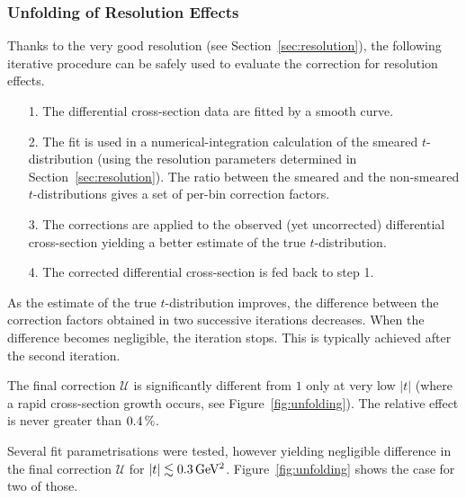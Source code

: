 
\subsubsection{Unfolding of Resolution Effects}
\label{sec:unfolding}

Thanks to the very good resolution (see Section~\ref{sec:resolution}), the following iterative procedure can be safely used to evaluate the correction for resolution effects.
\begin{itemize}
\item[1.] The differential cross-section data are fitted by a smooth curve.
\item[2.] The fit is used in a numerical-integration calculation of the smeared $t$-distribution (using the resolution parameters determined in Section~\ref{sec:resolution}). The ratio between the smeared and the non-smeared $t$-distributions gives a set of per-bin correction factors.
\item[3.] The corrections are applied to the observed (yet uncorrected) differential cross-section yielding a better estimate of the true $t$-distribution.
\item[4.] The corrected differential cross-section is fed back to step 1.
\end{itemize}
As the estimate of the true $t$-distribution improves, the difference between the correction factors obtained in two successive iterations decreases. When the difference becomes negligible, the iteration stops. This is typically achieved after the second iteration. 

The final correction $\mathcal{U}$ is significantly different from $1$ only at very low $|t|$ (where a rapid cross-section growth occurs, see Figure~\ref{fig:unfolding}). The relative effect is never greater than $0.4\,{\rm \%}$.

Several fit parametrisations were tested, however yielding negligible difference in the final correction $\mathcal{U}$ for $|t| \lesssim 0.3\,{\rm GeV^2}$. Figure~\ref{fig:unfolding} shows the case for two of those.

